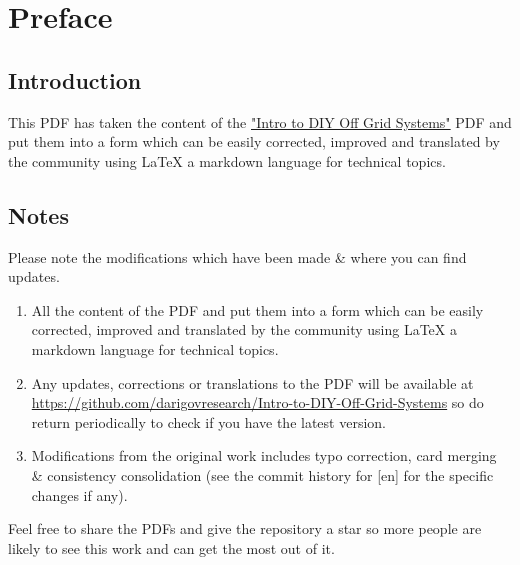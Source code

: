 \documentclass{article}
\theoremstyle{definition}
\theoremstyle{definition}
\theoremstyle{remark}
\begin{document}
\newpage

\tableofcontents

\newpage

\section{Preface} %
\label{sec:preface}

  \subsection*{Introduction} %
  \label{sub:introduction}
  
    This PDF has taken the content of the \href{https://www.demandenergyequality.org/get-started-with-offgrid}{"Intro to DIY Off Grid Systems"} PDF and put them into a form which can be easily corrected, improved and translated by the community using LaTeX a markdown language for technical topics.


  \subsection*{Notes} %
  \label{sub:notes}

    Please note the modifications which have been made \& where you can find updates.

    \begin{enumerate}
      \item All the content of the PDF and put them into a form which can be easily corrected, improved and translated by the community using LaTeX a markdown language for technical topics.
      \item Any updates, corrections or translations to the PDF will be available at \href{https://github.com/darigovresearch/Intro-to-DIY-Off-Grid-Systems}{https://github.com/darigovresearch/Intro-to-DIY-Off-Grid-Systems} so do return periodically to check if you have the latest version.
      \item Modifications from the original work includes typo correction, card merging \& consistency consolidation (see the commit history for [en] for the specific changes if any).
    \end{enumerate}

    Feel free to share the PDFs and give the repository a star so more people are likely to see this work and can get the most out of it.

\end{document}
